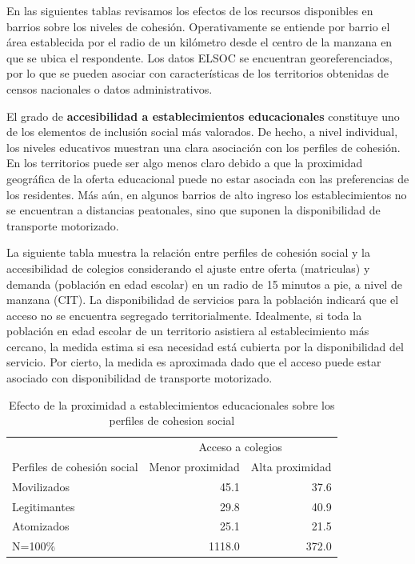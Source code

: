 \documentclass[
  12pt,
]{book}
\begin{document}
En las siguientes tablas revisamos los efectos de los recursos disponibles en barrios sobre los niveles de cohesión. Operativamente se entiende por barrio el área establecida por el radio de un kilómetro desde el centro de la manzana en que se ubica el respondente. Los datos ELSOC se encuentran georeferenciados, por lo que se pueden asociar con características de los territorios obtenidas de censos nacionales o datos administrativos.

El grado de \textbf{accesibilidad a establecimientos educacionales} constituye uno de los elementos de inclusión social más valorados. De hecho, a nivel individual, los niveles educativos muestran una clara asociación con los perfiles de cohesión. En los territorios puede ser algo menos claro debido a que la proximidad geográfica de la oferta educacional puede no estar asociada con las preferencias de los residentes. Más aún, en algunos barrios de alto ingreso los establecimientos no se encuentran a distancias peatonales, sino que suponen la disponibilidad de transporte motorizado.

La siguiente tabla muestra la relación entre perfiles de cohesión social y la accesibilidad de colegios considerando el ajuste entre oferta (matriculas) y demanda (población en edad escolar) en un radio de 15 minutos a pie, a nivel de manzana (CIT). La disponibilidad de servicios para la población indicará que el acceso no se encuentra segregado territorialmente. Idealmente, si toda la población en edad escolar de un territorio asistiera al establecimiento más cercano, la medida estima si esa necesidad está cubierta por la disponibilidad del servicio. Por cierto, la medida es aproximada dado que el acceso puede estar asociado con disponibilidad de transporte motorizado.

\begin{table}

\caption{\label{tab:clases-acced}Efecto de la proximidad a establecimientos educacionales sobre los perfiles de cohesion social}
\centering
\begin{tabular}[t]{l|r|r}
\hline
\multicolumn{1}{c|}{ } & \multicolumn{2}{c}{Acceso a colegios} \\
\cline{2-3}
Perfiles de cohesión social & Menor proximidad & Alta proximidad\\
\hline
Movilizados & 45.1 & 37.6\\
\hline
Legitimantes & 29.8 & 40.9\\
\hline
Atomizados & 25.1 & 21.5\\
\hline
N=100\% & 1118.0 & 372.0\\
\hline
\end{tabular}
\end{table}
\end{document}
